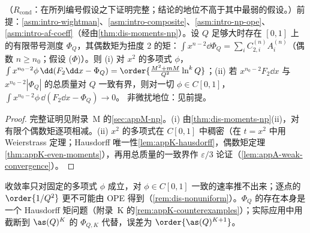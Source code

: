 \begin{corollary}\label{cor:dis-weak-xspace}
（$R_{\mathrm{cond}}$：在所列编号假设之下证明完整；结论的地位不高于其中最弱的假设。）前提：\cref{asm:intro-wightman}、\cref{asm:intro-composite}、\cref{asm:intro-np-ope}、\cref{asm:intro-af-coeff}（经由\cref{thm:dis-moments-np}）。设 $Q$ 足够大时存在 $[0,1]$ 上的有限带号测度 $\Phi_Q$，其偶数矩为扭度 2 的矩：$\int x^{n-2}\dd\Phi_Q=\sum_iC^{(n)}_{2,i}A^{(n)}_i$（偶数 $n\ge n_0$；假设 ($\Phi$)）。则 (i) 对 $x^2$ 的多项式 $\phi$，$\int x^{n_0-2}\phi\,\dd(F_2\dd x-\Phi_Q)=\order{\frac{M^2+mM}{Q^2}\ln^kQ}$；(ii) 若 $x^{n_0-2}F_2\dd x$ 与 $x^{n_0-2}|\Phi_Q|$ 的总质量对 $Q$ 一致有界，则对一切 $\phi\in C[0,1]$，$\int x^{n_0-2}\phi\,\dd(F_2\dd x-\Phi_Q)\to0$。
非微扰地位：见前提。
\end{corollary}

\begin{proof}
完整证明见附录~M 的\cref{sec:appM-np}。(i) 由\cref{thm:dis-moments-np}(ii)，对有限个偶数矩逐项相减。(ii) $x^2$ 的多项式在 $C[0,1]$ 中稠密（在 $t=x^2$ 中用 Weierstrass 定理；Hausdorff 唯一性\cref{lem:appK-hausdorff}，偶数矩定理\cref{thm:appK-even-moments}），再用总质量的一致界作 $\varepsilon/3$ 论证（\cref{lem:appA-weak-convergence}）。
\end{proof}

收敛率只对固定的多项式 $\phi$ 成立，对 $\phi\in C[0,1]$ 一致的速率推不出来；逐点的 $\order{1/Q^2}$ 更不可能由 OPE 得到（\cref{rem:dis-nonuniform}）。$\Phi_Q$ 的存在本身是一个 Hausdorff 矩问题（附录~K 的\cref{rem:appK-counterexamples}）；实际应用中用截断到 $\as(Q)^K$ 的 $\Phi_{Q,K}$ 代替，误差为 $\order{\as(Q)^{K+1}}$。

